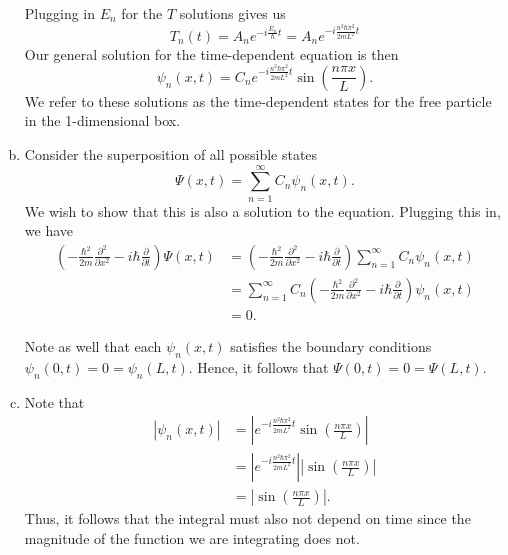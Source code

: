 \documentclass[12pt]{article} %
\begin{document}
\begin{solution}
\begin{enumerate}[(a)]
    Plugging in $E_n$ for the $T$ solutions gives us
    \[
    T_n(t) = A_ne^{-i\frac{E_n}{\hbar}t}=A_n e^{-i\frac{n^2\hbar \pi^2}{2mL^2}t}
    \]
    Our general solution for the time-dependent equation is then
    \[
    \boxed{\psi_n(x,t) = C_n e^{-i\frac{n^2\hbar \pi^2}{2mL^2}t} \sin\left(\frac{n\pi x}{L}\right).}
    \]
    We refer to these solutions as the time-dependent states for the free particle in the 1-dimensional box.
    
    \item Consider the superposition of all possible states
    \[
    \Psi(x,t) = \sum_{n=1}^\infty C_n \psi_n(x,t).
    \]
    We wish to show that this is also a solution to the equation.  Plugging this in, we have
    \begin{align*}
        \left(-\frac{\hbar^2}{2m}\frac{\partial^2}{\partial x^2} - i\hbar \frac{\partial}{\partial t} \right) \Psi(x,t) &= \left(-\frac{\hbar^2}{2m}\frac{\partial^2}{\partial x^2} - i\hbar \frac{\partial}{\partial t} \right) \sum_{n=1}^\infty C_n \psi_n(x,t)\\
        &= \sum_{n=1}^\infty C_n \left(-\frac{\hbar^2}{2m}\frac{\partial^2}{\partial x^2} - i\hbar \frac{\partial}{\partial t} \right) \psi_n(x,t)\\
        &= 0.
    \end{align*}
    
    Note as well that each $\psi_n(x,t)$ satisfies the boundary conditions $\psi_n(0,t)=0=\psi_n(L,t)$. Hence, it follows that $\Psi(0,t)=0=\Psi(L,t)$.
    \item Note that
    \begin{align*}
    \left| \psi_n(x,t)\right| &= \left| e^{-i\frac{n^2\hbar \pi^2}{2mL^2}t} \sin\left(\frac{n\pi x}{L}\right) \right|\\
    &= \left| e^{-i\frac{n^2\hbar \pi^2}{2mL^2}t} \right| \left| \sin\left(\frac{n\pi x}{L}\right) \right|\\
    &= \left|\sin\left(\frac{n\pi x}{L}\right)\right|.
    \end{align*}
    Thus, it follows that the integral must also not depend on time since the magnitude of the function we are integrating does not.
\end{enumerate}
\end{solution}
\end{document}

